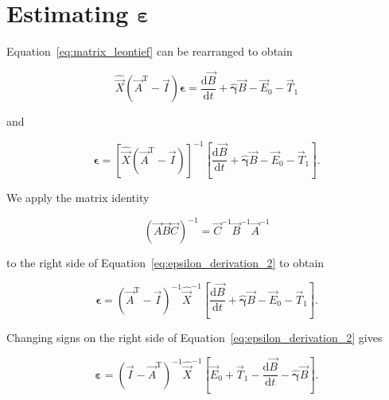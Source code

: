 \section{Estimating $\bm{\varepsilon}$}

Equation~\ref{eq:matrix_leontief} can be rearranged to obtain

\begin{equation} \label{eq:epsilon_derivation_1}
	\hat{\vec{X}} (\vec{A}^{\mathrm{T}} - \vec{I}) \bm{\epsilon}
	= \frac{\mathrm{d}\vec{B}}{\mathrm{d}t}
	+ \hat{\bm{\gamma}} \vec{B}
	- \vec{E}_{0}
	- \vec{T}_{1} 
\end{equation}

\noindent{}and

\begin{equation} \label{eq:epsilon_derivation_2}
	\bm{\epsilon}
	= {\left[ \hat{\vec{X}} (\vec{A}^{\mathrm{T}} - \vec{I}) \right]}^{-1}
		\left[
			\frac{\mathrm{d}\vec{B}}{\mathrm{d}t}
			+ \hat{\bm{\gamma}} \vec{B}
			- \vec{E}_{0}
			- \vec{T}_{1} 
		\right].
\end{equation}

\noindent{}We apply the matrix identity~\cite[Formula 6.2, p. 308]{Beyer:1991vd}

\begin{equation} \label{eq:matrix_identity_Beyer}
	{\left(\vec{A}\vec{B}\vec{C}\right)}^{-1} 
	= \vec{C}^{-1} \vec{B}^{-1} \vec{A}^{-1}
\end{equation}

\noindent{}to the right side of Equation~\ref{eq:epsilon_derivation_2} to obtain

\begin{equation} \label{eq:epsilon_derivation_3}
	\bm{\epsilon}
	= {(\vec{A}^{\mathrm{T}} - \vec{I})}^{-1} {\hat{\vec{X}}}^{-1} 
		\left[
			\frac{\mathrm{d}\vec{B}}{\mathrm{d}t}
			+ \hat{\bm{\gamma}} \vec{B}
			- \vec{E}_{0}
			- \vec{T}_{1} 
		\right].
\end{equation}

\noindent{}Changing signs on the right side 
of Equation~\ref{eq:epsilon_derivation_2} gives

\begin{equation} \label{eq:epsilon_leontief_with_A}
	\bm{\varepsilon} 
	= {(\vec{I} - \vec{A}^{\mathrm{T}})}^{-1}\hat{\vec{X}}^{-1}
		\left[\vec{E}_{0} 
				+ \vec{T}_{1} 
				- \frac{\mathrm{d}\vec{B}}{\mathrm{d}t} 
				- \hat{\bm{\gamma}}\vec{B}
		\right].
\end{equation}

